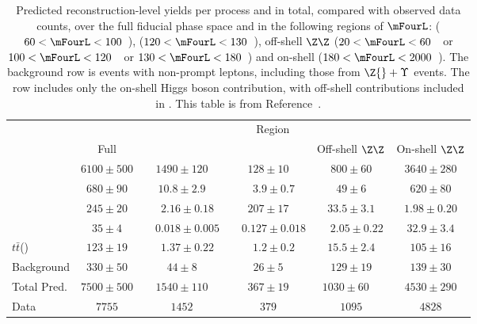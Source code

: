 \begin{table}
    \centering    
  \begin{tabular} {l  c  c  c  c  c }
 \hline 
  & \multicolumn{5}{c}{Region} \\
      & Full   & \ZFourL{}  & \HFourL{}  & Off-shell $\Z\Z$  & On-shell $\Z\Z$   \\

 \hline 
\qqFourL{} & $6100 \pm 500$  & $1490 \pm 120$  & $128 \pm 10$  & $800 \pm 60$  & $3640 \pm 280$ \\
\ggFourL{} & $680 \pm 90$  & $10.8 \pm 2.9$  & ~~$3.9 \pm 0.7$  & $49 \pm 6$  & $620 \pm 80$ \\
\HFourL{}  & $245 \pm 20$  & ~~$2.16 \pm 0.18$  & $207 \pm 17$  & $33.5 \pm 3.1$  & $1.98 \pm 0.20$ \\
\V\V\V{}  & $35 \pm 4$  & ~~$0.018 \pm 0.005$  & ~~$0.127 \pm 0.018$  & ~~$2.05 \pm 0.22$  & $32.9 \pm 3.4$ \\
$t\bar{t}$\V(\V) & $123 \pm 19$  & ~~$1.37 \pm 0.22$  & ~~$1.2 \pm 0.2$  & $15.5 \pm 2.4$  & $105 \pm 16$ \\
Background & $330 \pm 50$  & $44 \pm 8$  & $26 \pm 5$  & $129 \pm 19$  & $139 \pm 30$ \\    
\hline 
Total Pred. & $7500 \pm 500$  & $1540 \pm 110$  & $367 \pm 19$  & $1030 \pm 60$~~  & $4530 \pm 290$ \\
\hline 
Data & $7755 $  & $1452 $  & $379 $  & $1095 $  & $4828 $ \\
 \hline 
 \end{tabular}
     \caption{Predicted reconstruction-level yields per process and in total,
      compared with observed data counts, over the full fiducial phase space and in the
      following regions of
      $\mFourL$: \ZFourL{}  ($60 < \mFourL < 100$~\GeV), \HFourL{}  ($120 <
\mFourL < 130$~\GeV), off-shell $\Z\Z$  ($20 <
\mFourL < 60$~\GeV\ or $100 <
\mFourL < 120$~\GeV\ or $130 <
\mFourL < 180$~\GeV) and  on-shell \Z\Z{} ($180 <
\mFourL < 2000$~\GeV).
     The background row is events with non-prompt leptons,
     including those from $\Z{} + \Upsilon{}$ events.
      The \HFourL{} row includes only the
      on-shell Higgs boson contribution, with off-shell contributions included in
     \ggFourL{}. This table is from Reference~\cite{m4l_internalnote}. \label{tab:RecoYieldTablePerProcess} }
\end{table}

